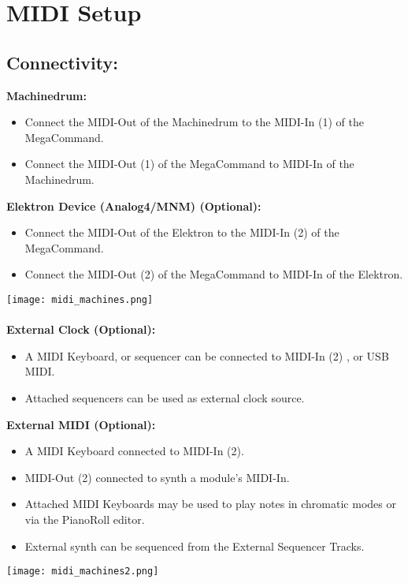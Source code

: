 \chapter{MIDI Setup}
\section{Connectivity:}
\textbf{Machinedrum:}
\begin{itemize}
    \item Connect the MIDI-Out of the Machinedrum to the MIDI-In (1) of the MegaCommand.
    \item Connect the MIDI-Out (1) of the MegaCommand to MIDI-In of the Machinedrum.
\end{itemize}

\textbf{Elektron Device (Analog4/MNM) (Optional):}
\begin{itemize}
    \item Connect the MIDI-Out of the Elektron to the MIDI-In (2) of the MegaCommand. 
    \item Connect the MIDI-Out (2) of the MegaCommand to MIDI-In of the Elektron.
\end{itemize}
\texttt{[image: midi\_machines.png]}\\
\\
\textbf{External Clock (Optional):} 

\begin{itemize}
    \item A MIDI Keyboard, or sequencer can be connected to MIDI-In (2) , or USB MIDI. 
    \item Attached sequencers can be used as external clock source.
\end{itemize}

\textbf{External MIDI (Optional):}

\begin{itemize}
    \item A MIDI Keyboard connected to MIDI-In (2). 
    \item MIDI-Out (2) connected to synth a module's MIDI-In.
    \item Attached MIDI Keyboards may be used to play notes in chromatic modes or via the PianoRoll editor.
    \item External synth can be sequenced from the External Sequencer Tracks.
\end{itemize}



\newpage

\texttt{[image: midi\_machines2.png]}\\
